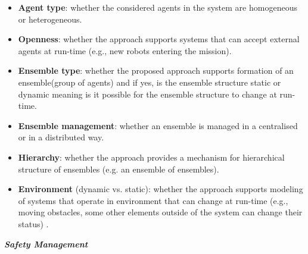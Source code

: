 \documentclass[journal]{IEEEtran}
\theoremstyle{definition}
\begin{document}
\begin{itemize}
\item \textbf{Agent type}: whether the considered agents in the system are homogeneous or heterogeneous. 

\item \textbf{Openness}: whether the approach supports systems that can accept external agents at run-time (e.g., new robots entering the mission). 



\item \textbf{Ensemble type}: whether the proposed approach supports formation of an ensemble(group of agents) and if yes, is the ensemble structure static or dynamic meaning is it possible for the ensemble structure to change at run-time. %
	\item \label{lbl:confl}
\textbf{Ensemble management}: whether an ensemble is managed in a centralised or in a distributed way. %
	\item \label{lbl:hierarchy}
\textbf{Hierarchy}: whether the approach provides a mechanism for hierarchical structure of ensembles (e.g. an ensemble of ensembles).
\item \textbf{Environment} (dynamic vs. static): whether the approach supports modeling of systems that operate in environment that can change at run-time (e.g., moving obstacles, some other elements outside of the system can change their status) .
\end{itemize}


\textbf{\textit{Safety Management}}
\end{document}
